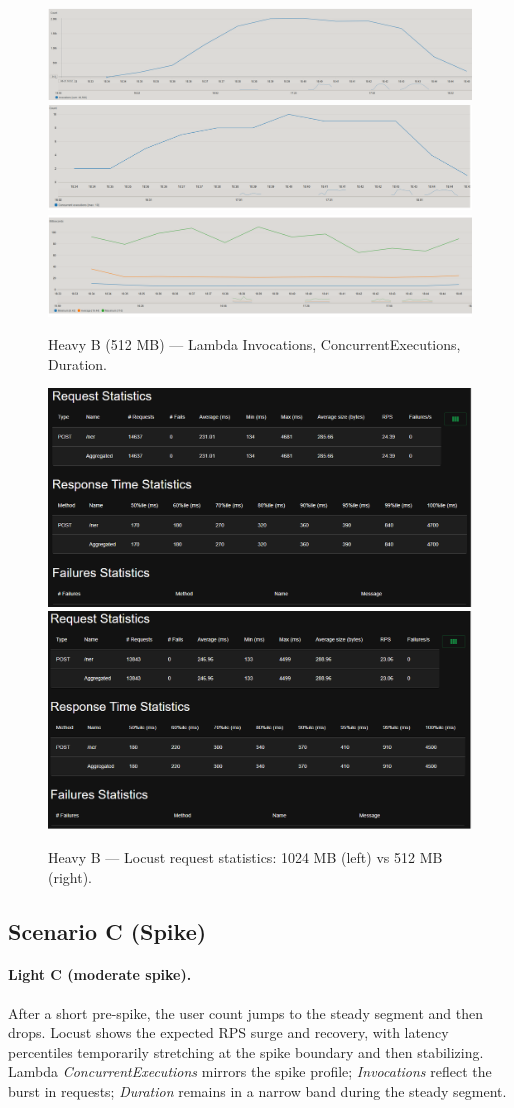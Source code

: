 \documentclass[11pt,a4paper]{article}
\begin{document}
\begin{figure}[h!] \centering
  \includegraphics[width=.32\linewidth]{"figures/hBl - Invocations.png"}\hfill
  \includegraphics[width=.32\linewidth]{"figures/hBl - ConcEx.png"}\hfill
  \includegraphics[width=.32\linewidth]{"figures/hBl - Duration.png"}
  \caption{Heavy B (512 MB) --- Lambda Invocations, ConcurrentExecutions, Duration.}
\end{figure}

\begin{figure}[h!] \centering
  \includegraphics[width=.49\linewidth]{"figures/hB - Stats.png"}\hfill
  \includegraphics[width=.49\linewidth]{"figures/hBl - Stats.png"}
  \caption{Heavy B --- Locust request statistics: 1024 MB (left) vs 512 MB (right).}
\end{figure}

\subsection{Scenario C (Spike)}\label{subsec:resC}

\paragraph{Light C (moderate spike).}
After a short pre-spike, the user count jumps to the steady segment and then drops. Locust shows the expected RPS surge and recovery, with latency percentiles temporarily stretching at the spike boundary and then stabilizing. Lambda \emph{ConcurrentExecutions} mirrors the spike profile; \emph{Invocations} reflect the burst in requests; \emph{Duration} remains in a narrow band during the steady segment.
\end{document}
